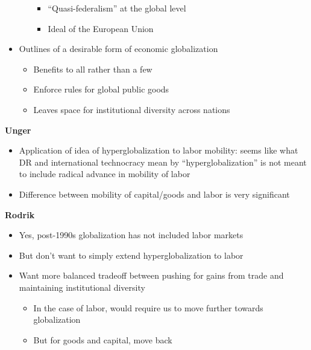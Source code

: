 \begin{itemize}
\begin{itemize}
    \begin{itemize}
    \tightlist
    \item
      ``Quasi-federalism'' at the global level
    \item
      Ideal of the European Union
    \end{itemize}
  \end{itemize}
\item
  Outlines of a desirable form of economic globalization

  \begin{itemize}
  \tightlist
  \item
    Benefits to all rather than a few
  \item
    Enforce rules for global public goods
  \item
    Leaves space for institutional diversity across nations
  \end{itemize}
\end{itemize}

\textbf{Unger}

\begin{itemize}
\tightlist
\item
  Application of idea of hyperglobalization to labor mobility: seems
  like what DR and international technocracy mean by
  ``hyperglobalization'' is not meant to include radical advance in
  mobility of labor
\item
  Difference between mobility of capital/goods and labor is very
  significant
\end{itemize}

\textbf{Rodrik}

\begin{itemize}
\tightlist
\item
  Yes, post-1990s globalization has not included labor markets
\item
  But don't want to simply extend hyperglobalization to labor
\item
  Want more balanced tradeoff between pushing for gains from trade and
  maintaining institutional diversity

  \begin{itemize}
  \tightlist
  \item
    In the case of labor, would require us to move further towards
    globalization
  \item
    But for goods and capital, move back
  \end{itemize}
\end{itemize}

